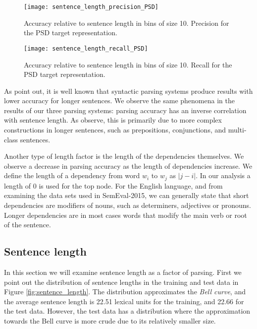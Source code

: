 \begin{figure}[h]
    \centering
    \begin{minipage}{0.8\textwidth}
        \centering
        \texttt{[image: sentence\_length\_precision\_PSD]}
    \end{minipage}
    \caption{Accuracy relative to sentence length in bins of size 10. Precision for the PSD target representation.}
    \label{fig:s_length_PSD_1}
\end{figure}

\begin{figure}[h]
    \centering
    \begin{minipage}{0.8\textwidth}
        \centering
        \texttt{[image: sentence\_length\_recall\_PSD]}
    \end{minipage}\hfill
    \caption{Accuracy relative to sentence length in bins of size 10. Recall for the PSD target representation.}
    \label{fig:s_length_PSD_2}
\end{figure}

As  point out, it is well known that syntactic parsing systems produce results with lower accuracy for longer sentences. We observe the same phenomena in the results of our three parsing systems: parsing accuracy has an inverse correlation with sentence length. As  observe, this is primarily due to more complex constructions in longer sentences, such as prepositions, conjunctions, and multi-class sentences.

Another type of length factor is the length of the dependencies themselves. We observe a decrease in parsing accuracy as the length of dependencies increase. We define the length of a dependency from word $w_i$ to $w_j$ as $|j - i|$. In our analysis a length of $0$ is used for the top node. For the English language, and from examining the data sets used in SemEval-2015, we can generally state that short dependencies are modifiers of nouns, such as determiners, adjectives or pronouns. Longer dependencies are in most cases words that modify the main verb or root of the sentence.

\subsection{Sentence length}

In this section we will examine sentence length as a factor of parsing. First we point out the distribution of sentence lengths in the training and test data in Figure \ref{fig:sentence_length}. The distribution approximates the \textit{Bell curve}, and the average sentence length is 22.51 lexical units for the training, and 22.66 for the test data. However, the test data has a distribution where the approximation towards the Bell curve is more crude due to its relatively smaller size.

